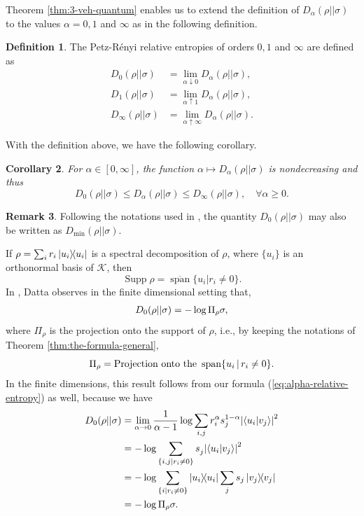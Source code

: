 \documentclass[12pt,a4paper,oneside]{article}
\numberwithin{equation}{section}
\theoremstyle{definition}  %
\newtheorem{defn}{Definition}[section]
\newtheorem{rmk}[defn]{Remark}
\theoremstyle{plain}  %
\newtheorem{cor}[defn]{Corollary}
\theoremstyle{remark} %
\newcommand{\CK}{\mathcal{K}}
\let\tr\relax
\DeclareMathOperator{\tr}{Tr}
\DeclareMathOperator{\supp}{Supp}
\DeclareMathOperator{\spn}{span}
\begin{document}
 Theorem \ref{thm:3-veh-quantum} enables us to extend the definition of $D_{\alpha}(\rho||\sigma)$ to the values $\alpha = 0,1$ and $\infty$ as in the following definition.
\begin{defn}\label{defn:extended-orders-quantum}
 The Petz-R\'enyi relative entropies of orders $0, 1$ and $\infty$ are defined as \begin{align*}
     D_0(\rho||\sigma) &= \lim\limits_{\alpha \downarrow 0} D_{\alpha}(\rho||\sigma),\\
     D_1(\rho||\sigma) &= \lim\limits_{\alpha \uparrow 1} D_{\alpha}(\rho||\sigma),\\
     D_{\infty}(\rho||\sigma) &= \lim\limits_{\alpha \uparrow \infty} D_{\alpha}(\rho||\sigma).
 \end{align*}
\end{defn}
With the definition above, we have the following corollary.
\begin{cor}
For $\alpha\in [0,\infty]$, the function $\alpha\mapsto D_{\alpha}(\rho||\sigma)$ is nondecreasing and thus \[D_0(\rho||\sigma)\leq D_{\alpha}(\rho||\sigma)\leq D_{\infty}(\rho||\sigma), \quad \forall \alpha\geq0.\]
\end{cor}
\begin{rmk} Following the notations used in \cite{Datta2009},
the quantity $D_0(\rho||\sigma)$  may also be written as $D_{\operatorname{min}}(\rho||\sigma)$.
\end{rmk}
If $\rho = \sum_ir_i\ketbra{u_i}{u_i}$ is a spectral decomposition of $\rho$, where $\{u_i\}$ is an orthonormal basis of $\CK$, then
\begin{equation}\label{eq:support-formula}
 \supp\rho = \overline{\spn}\{u_i|r_i\neq 0 \}.   
\end{equation} 
In \cite{Datta2009}, Datta observes in the finite dimensional setting that,  \begin{align}\label{eq:datta-leditzky}
    D_0(\rho||\sigma) = -\log \tr \Pi_{\rho}\sigma,
\end{align}
where $\Pi_{\rho}$ is the projection onto the support of $\rho$, i.e., by keeping the notations of Theorem \ref{thm:the-formula-general}, \[\Pi_{\rho} = \textnormal{Projection onto the }\spn\{u_i\,|\,r_i\neq 0\}.\] In the finite dimensions, this result  follows from our  formula (\ref{eq:alpha-relative-entropy}) as well, because  we have \begin{align}\label{eq:datta-leditzky-computation}
    \begin{split}
       D_0(\rho||\sigma)&= \lim_{\alpha\rightarrow0}\frac{1}{\alpha-1}\log \sum\limits_{i,j} r_i^{\alpha}s_j^{1-\alpha}\abs{\braket{u_i}{v_j}}^2\\
       & = -\log \sum\limits_{\{i,j|r_i\neq 0\}}s_j^{}\abs{\braket{u_i}{v_j}}^2\\
       &=-\log \tr \sum_{\{i|r_i\neq 0\}}\ketbra{u_i}{u_i}\sum_{j}s_j\ketbra{v_j}{v_j}\\
       &= -\log \tr \Pi_{\rho}\sigma.
    \end{split}
\end{align}
\end{document}
